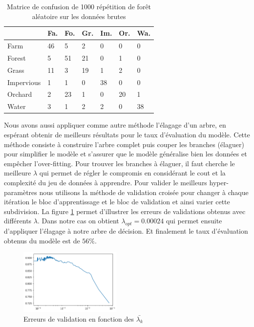 \documentclass[twocolumn,10pt]{article}
\begin{document}
\begin{table}[h]
	\caption{Matrice de confusion de 1000 répétition de forêt aléatoire sur les données brutes}
	\label{confusion_matrix_1000xforeset}
	\begin{tabular}{l|llllll}
		           & Fa. & Fo. & Gr. & Im. & Or. & Wa. \\ \hline
		Farm       & 46   & 5      & 2     & 0          & 0       & 0     \\
		Forest     & 5    & 51     & 21    & 0          & 1       & 0     \\
		Grass      & 11   & 3      & 19    & 1          & 2       & 0     \\
		Impervious & 1    & 1      & 0     & 38         & 0       & 0     \\
		Orchard    & 2    & 23     & 1     & 0          & 20      & 1     \\
		Water      & 3    & 1      & 2     & 2          & 0       & 38
	\end{tabular}
\end{table}


Nous avons aussi appliquer comme autre méthode l'élagage d'un arbre, en espérant obtenir de meilleurs résultats pour le taux d'évaluation du modèle. Cette méthode consiste à construire l'arbre complet puis couper les branches (élaguer) pour simplifier le modèle et s'assurer que le modèle généralise bien les données et empêcher l'over-fitting. Pour trouver les branches à élaguer, il faut cherche le meilleure $\lambda$ qui permet de régler le compromis en considérant le cout et la complexité du jeu de données à apprendre. Pour valider le meilleurs hyper-paramètres nous utilisons la méthode de validation croisée pour changer à chaque itération le bloc d'apprentissage et le bloc de validation et ainsi varier cette subdivision. La figure \ref{fig:elagage} permet d'illustrer les erreurs de validations obtenus avec différents $\lambda$. Dans notre cas on obtient $\lambda_{opt} = 0.00024$ qui permet ensuite d'appliquer l'élagage à notre arbre de décision. Et finalement le taux d'évaluation obtenus du modèle est de $56\%$.

 
\begin{figure}[htbp]
	\begin{center}
		\includegraphics[width=0.45\textwidth]{figures/Tree/elagage.png}
		\caption{\label{fig:elagage}Erreurs de validation en fonction des $\bar{\lambda_k}$} 
	\end{center}
\end{figure}
\end{document}
